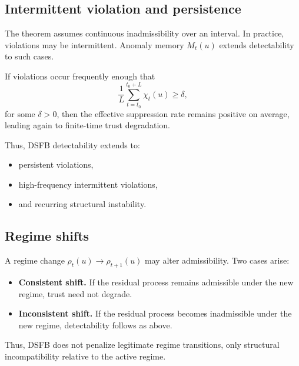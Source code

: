 \documentclass[11pt,letterpaper]{article}
\theoremstyle{gcresult}
\theoremstyle{definition}
\begin{document}

\subsection{Intermittent violation and persistence}

The theorem assumes continuous inadmissibility over an interval. In practice, violations may be intermittent. Anomaly memory $M_t(u)$ extends detectability to such cases.

If violations occur frequently enough that
\begin{equation}
\frac{1}{L}\sum_{t=t_0}^{t_0+L}\chi_t(u) \ge \delta,
\end{equation}
for some $\delta>0$, then the effective suppression rate remains positive on average, leading again to finite-time trust degradation.

Thus, DSFB detectability extends to:
\begin{itemize}[leftmargin=1.5em]
    \item persistent violations,
    \item high-frequency intermittent violations,
    \item and recurring structural instability.
\end{itemize}


\subsection{Regime shifts}

A regime change $\rho_t(u)\rightarrow \rho_{t+1}(u)$ may alter admissibility. Two cases arise:

\begin{itemize}[leftmargin=1.5em]
    \item \textbf{Consistent shift.} If the residual process remains admissible under the new regime, trust need not degrade.
    \item \textbf{Inconsistent shift.} If the residual process becomes inadmissible under the new regime, detectability follows as above.
\end{itemize}

Thus, DSFB does not penalize legitimate regime transitions, only structural incompatibility relative to the active regime.
\end{document}
